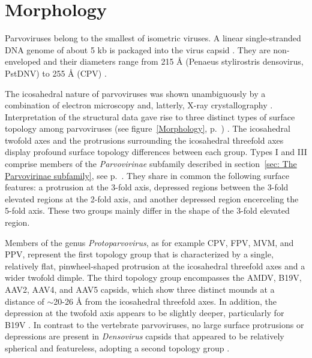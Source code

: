 
\chapter{Morphology} %

\label{Chapter3} %



\label{sec:Morphology}

Parvoviruses belong to the smallest of isometric viruses. A linear single-stranded DNA genome of about 5 kb is packaged into the virus capsid \cite{pmid4975639, pmid5264145, pmid5429749}. They are non-enveloped and their diameters range from 215 \r{A} (Penaeus stylirostris densovirus, PstDNV) to 255 \r{A} (CPV) \cite{pmid10497831, icvt}. 

The icosahedral nature of parvoviruses was shown unambiguously by a combination of electron microscopy and, latterly, X-ray crystallography \cite{pmid2006420}. Interpretation of the structural data gave rise to three distinct types of surface topology among parvoviruses (see figure~\ref{Morphology}, p.~\pageref{Morphology}) \cite{pmid15795290}. The icosahedral twofold axes and the protrusions surrounding the icosahedral threefold axes display profound surface topology differences between each group. Types I and III comprise members of the \textit{Parvovirinae} subfamily described in section~\ref{sec: The Parvovirinae subfamily}, see p.~\pageref{sec: The Parvovirinae subfamily}. They share in common the following surface features: a protrusion at the 3-fold axis, depressed regions between the 3-fold elevated regions at the 2-fold axis, and another depressed region encerceling the 5-fold axis. These two groups mainly differ in the shape of the 3-fold elevated region. 

Members of the genus \textit{Protoparvovirus}, as for example CPV, FPV, MVM, and PPV, represent the first topology group that is characterized by a single, relatively flat, pinwheel-shaped protrusion at the icosahedral threefold axes and a wider twofold dimple. The third topology group encompasses the AMDV, B19V, AAV2, AAV4, and AAV5 capsids, which show three distinct mounds at a distance of $\sim$20-26 \r{A} from the icosahedral threefold axes. In addition, the depression at the twofold axis appears to be slightly deeper, particularly for B19V \cite{pmid20375175, pmid12136130, tropism}. In contrast to the vertebrate parvoviruses, no large surface protrusions or depressions are present in \textit{Densovirus} capsids that appeared to be relatively spherical and featureless, adopting a second topology group \cite{pmid15769470, pmid9817847}.        


